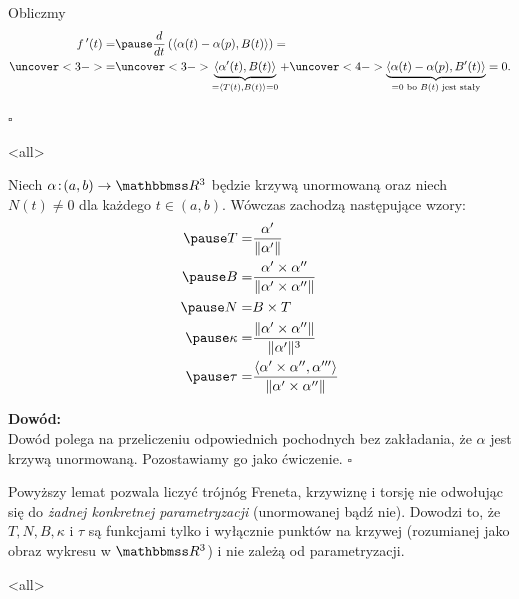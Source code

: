 \begin{frame}
Obliczmy 
\[\begin{split}
f\,'(t)=&\pause\frac{d}{dt}\left(\langle\alpha(t)-\alpha(p),B(t)\rangle\right)=\\
\uncover<3->{=}&\uncover<3->{\underbrace{\langle\alpha'(t),B(t)\rangle}_{=\langle T(t),B(t)\rangle=0}+}
\uncover<4->{\underbrace{\langle\alpha(t)-\alpha(p),B'(t) \rangle}_{=0\text{ bo $B(t)$ jest stały}}=0.}
\end{split}\]

\hfill $\square$
\end{frame}
\mode<all>{}
\begin{frame}
\begin{lemat}\label{lem_curv:wzory-ogolne}
Niech $\alpha\colon (a,b)\to \R^3$ będzie krzywą unormowaną oraz niech $N(t)\neq 0$ dla każdego $t\in (a,b)$. Wówczas zachodzą następujące wzory:
\begin{align}
\pause T=& \frac{\alpha'}{\|\alpha'\|}\label{eqn:T}\\
\pause B=& \frac{\alpha'\times \alpha''}{\|\alpha'\times \alpha''\|}\label{eqn:B}\\
\pause N=& B\times T\label{eqn:N}\\
\pause \kappa=&\frac{\|\alpha'\times \alpha''\|}{\|\alpha'\|^3}\label{eqn:k}\\
\pause \tau=&\frac{\langle \alpha'\times \alpha'',\alpha'''\rangle}{\|\alpha'\times \alpha''\|}\label{eqn:t}
\end{align}

\end{lemat}
\end{frame}
\begin{frame}[<+->]

\textcolor{ared}{\textbf{Dowód:}}\pause \\
Dowód  polega na przeliczeniu odpowiednich pochodnych bez zakładania, że $\alpha$ jest krzywą unormowaną. Pozostawiamy go jako ćwiczenie.
\hfill $\square$

\pause\begin{uwaga}
Powyższy lemat pozwala liczyć trójnóg Freneta, krzywiznę i torsję nie odwołując się do \textit{żadnej konkretnej parametryzacji} (unormowanej bądź nie). Dowodzi to, że $T,N,B,\kappa$ i $\tau$ są funkcjami tylko i wyłącznie punktów na krzywej (rozumianej jako obraz wykresu w $\R^3$) i nie zależą od parametryzacji.
\end{uwaga}

\end{frame}
\mode<all> 
